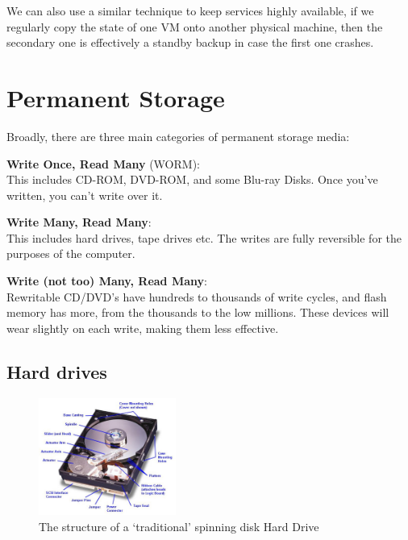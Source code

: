 We can also use a similar technique to keep services highly available, if we
regularly copy the state of one VM onto another physical machine, then the
secondary one is effectively a standby backup in case the first one crashes.

\section{Permanent Storage}

Broadly, there are three main categories of permanent storage media:

\begin{description}
  \item \textbf{Write Once, Read Many} (WORM):\\
    This includes CD-ROM, DVD-ROM, and some Blu-ray Disks. Once you've written,
    you can't write over it.
  \item \textbf{Write Many, Read Many}:\\
    This includes hard drives, tape drives etc. The writes are fully reversible
    for the purposes of the computer. 
  \item \textbf{Write (not too) Many, Read Many}:\\
    Rewritable CD/DVD's have hundreds to thousands of write cycles, and flash
    memory has more, from the thousands to the low millions. These devices will
    wear slightly on each write, making them less effective.
\end{description}

\subsection{Hard drives}

\begin{figure}
  \centering
  \includegraphics[width=0.4\textwidth]{images/hard-drive}
  \caption{The structure of a `traditional' spinning disk Hard Drive}
  \label{hard-drive}
\end{figure}

